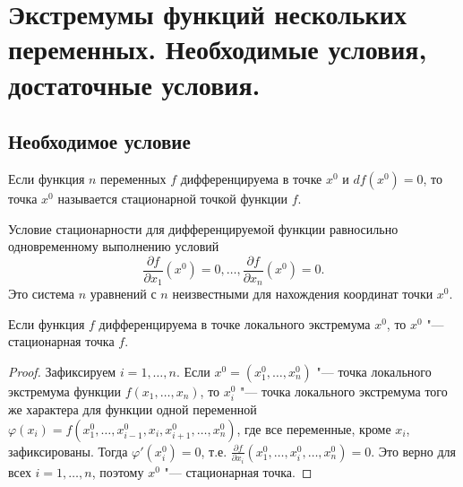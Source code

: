 \chapter{Экстремумы функций нескольких переменных. Необходимые условия, достаточные условия.}

\section{Необходимое условие}


\begin{defn} \label{df18:5}
Если функция $n$ переменных $f$ дифференцируема в точке $x^0$ и $df(x^0) = 0$, то точка $x^0$ называется стационарной точкой функции $f$.
\end{defn}

\begin{notion}
    Условие стационарности для дифференцируемой функции равносильно одновременному выполнению условий
$$
\frac{\partial f}{\partial x_1}(x^0) = 0, \ldots, \frac{\partial f}{\partial x_n}(x^0) = 0.
$$
Это система $n$ уравнений с $n$ неизвестными для нахождения координат точки $x^0$.
\end{notion}



\begin{thm} \label{th18:5}
Если функция $f$ дифференцируема в точке локального экстремума $x^0$, то $x^0$ "--- стационарная точка $f$.
\end{thm}

\begin{proof}
Зафиксируем $i = 1, \ldots, n$. Если $x^0 = (x_1^0, \ldots, x_n^0)$ "--- точка локального экстремума функции $f(x_1, \ldots, x_n)$, то $x_i^0$ "--- точка локального экстремума того же характера для функции одной переменной $\varphi(x_i) = f(x_1^0, \ldots, x_{i-1}^0, x_i, x_{i+1}^0, \ldots, x_n^0)$, где все переменные, кроме $x_i$, зафиксированы. Тогда $\varphi'(x_i^0) = 0$, т.е. $\frac{\partial f}{\partial x_i}(x_1^0, \ldots, x_i^0, \ldots, x_n^0) = 0$. Это верно для всех $i = 1, \ldots, n$, поэтому $x^0$ "--- стационарная точка.
\end{proof}

